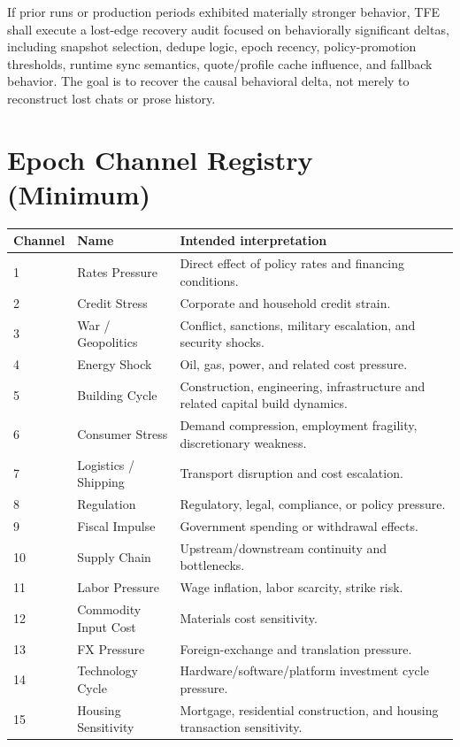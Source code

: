 \documentclass[11pt]{report}
\begin{document}
If prior runs or production periods exhibited materially stronger behavior, TFE shall execute a lost-edge recovery audit focused on behaviorally significant deltas, including snapshot selection, dedupe logic, epoch recency, policy-promotion thresholds, runtime sync semantics, quote/profile cache influence, and fallback behavior. The goal is to recover the causal behavioral delta, not merely to reconstruct lost chats or prose history.

\chapter{Epoch Channel Registry (Minimum)}
\renewcommand{\arraystretch}{1.12}
\begin{longtable}{p{}p{}p{}}
\toprule
Channel & Name & Intended interpretation \\
\midrule
1 & Rates Pressure & Direct effect of policy rates and financing conditions. \\
2 & Credit Stress & Corporate and household credit strain. \\
3 & War / Geopolitics & Conflict, sanctions, military escalation, and security shocks. \\
4 & Energy Shock & Oil, gas, power, and related cost pressure. \\
5 & Building Cycle & Construction, engineering, infrastructure and related capital build dynamics. \\
6 & Consumer Stress & Demand compression, employment fragility, discretionary weakness. \\
7 & Logistics / Shipping & Transport disruption and cost escalation. \\
8 & Regulation & Regulatory, legal, compliance, or policy pressure. \\
9 & Fiscal Impulse & Government spending or withdrawal effects. \\
10 & Supply Chain & Upstream/downstream continuity and bottlenecks. \\
11 & Labor Pressure & Wage inflation, labor scarcity, strike risk. \\
12 & Commodity Input Cost & Materials cost sensitivity. \\
13 & FX Pressure & Foreign-exchange and translation pressure. \\
14 & Technology Cycle & Hardware/software/platform investment cycle pressure. \\
15 & Housing Sensitivity & Mortgage, residential construction, and housing transaction sensitivity. \\

\end{longtable}
\end{document}
